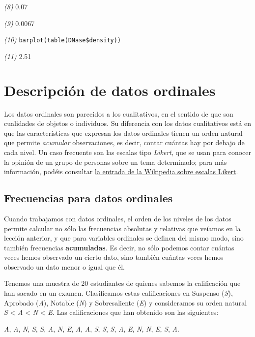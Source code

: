 \documentclass[]{book}
\theoremstyle{definition}
\theoremstyle{definition}
\theoremstyle{definition}
\theoremstyle{remark}
\let\BeginKnitrBlock\begin \let\EndKnitrBlock\end
\begin{document}
\emph{(8)} 0.07

\emph{(9)} 0.0067

\emph{(10)} \texttt{barplot(table(DNase\$density))}

\emph{(11)} 2.51

\hypertarget{chap:ord}{%
\chapter{Descripción de datos ordinales}\label{chap:ord}}

Los datos ordinales son parecidos a los cualitativos, en el sentido de que son cualidades de objetos o individuos. Su diferencia con los datos cualitativos está en que las características que expresan los datos ordinales tienen un orden natural que permite \emph{acumular} observaciones, es decir, contar cuántas hay por debajo de cada nivel. Un caso frecuente son las escalas tipo \emph{Likert}, que se usan para conocer la opinión de un grupo de personas sobre un tema determinado; para más información, podéis consultar \href{http://es.wikipedia.org/wiki/Escalas_Likert}{la entrada de la Wikipedia sobre escalas Likert}.

\hypertarget{frecuencias-para-datos-ordinales}{%
\section{Frecuencias para datos ordinales}\label{frecuencias-para-datos-ordinales}}

Cuando trabajamos con datos ordinales, el orden de los niveles de los datos permite calcular no sólo las frecuencias absolutas y relativas que veíamos en la lección anterior, y que para variables ordinales se definen del mismo modo, sino también frecuencias \textbf{acumuladas}. Es decir, no sólo podemos contar cuántas veces hemos observado un cierto dato, sino también cuántas veces hemos observado un dato menor o igual que él.

\BeginKnitrBlock{example}
\protect\hypertarget{exm:ex1701bis}{}{\label{exm:ex1701bis} }Tenemos una muestra de 20 estudiantes de quienes sabemos la calificación que han sacado en un examen. Clasificamos estas calificaciones en Suspenso (\emph{S}), Aprobado (\emph{A}), Notable (\emph{N}) y Sobresaliente (\emph{E}) y consideramos su orden natural \emph{S} \textless{} \emph{A} \textless{} \emph{N} \textless{} \emph{E}. Las calificaciones que han obtenido son las siguientes:

\emph{A}, \emph{A}, \emph{N}, \emph{S}, \emph{S}, \emph{A}, \emph{N}, \emph{E}, \emph{A}, \emph{A}, \emph{S}, \emph{S}, \emph{S}, \emph{A}, \emph{E}, \emph{N}, \emph{N}, \emph{E}, \emph{S}, \emph{A}.
\EndKnitrBlock{example}
\end{document}
